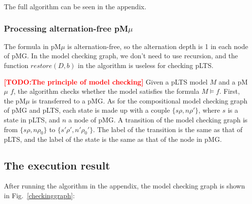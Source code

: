 \documentclass[runningheads,a4paper]{llncs}
\newcommand{\TODO}[1]{\textcolor{red}{\textbf{[TODO:#1]}}}
\begin{document}
The full algorithm can be seen in the appendix.

\subsubsection{Processing alternation-free pM$\mu$}
The formula in pM$\mu$ is alternation-free, so the alternation depth is 1 in each node of pMG. In the model checking graph, we don't need to use recursion, and the function $restore(D, b)$ in the algorithm is useless for checking pLTS.

\TODO{The principle of model checking}
Given a pLTS model $M$ and a pM$\mu$ $f$, the algorithm checks whether the model satisfies the formula $M\models f$. First, the pM$\mu$ is transferred to a pMG. As for the compositional model checking graph of pMG and pLTS, each state is made up with a couple $\{s\rho, n\rho'\}$, where $s$ is a state in pLTS, and $n$ a node of pMG. A transition of the model checking graph is from $\{s\rho, n\rho_{0}\}$ to $\{s'\rho', n'\rho_{0}'\}$.  The label of the transition is the same as that of pLTS, and the label of the state is the same as that of the node in pMG.



\subsection{The execution result}

After running the algorithm in the appendix, the model checking graph is shown in Fig.~\ref{checkinggraph}:
\end{document}
